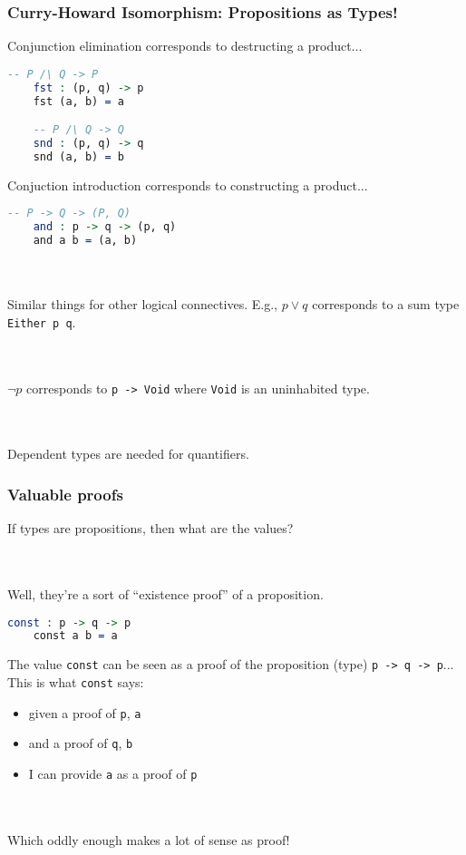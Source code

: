 \documentclass{beamer}
\begin{document}
\begin{frame}[fragile]
  \frametitle{Curry-Howard Isomorphism: Propositions as Types!}

  Conjunction elimination corresponds to destructing a product...
  \begin{lstlisting}[language=Idris]
    -- P /\ Q -> P
    fst : (p, q) -> p
    fst (a, b) = a

    -- P /\ Q -> Q
    snd : (p, q) -> q
    snd (a, b) = b
  \end{lstlisting}

  \pause
  Conjuction introduction corresponds to constructing a product...
  \begin{lstlisting}[language=Idris]
    -- P -> Q -> (P, Q)
    and : p -> q -> (p, q)
    and a b = (a, b)
  \end{lstlisting}

  \pause \\~\\
  Similar things for other logical connectives. E.g., $p \vee q$ corresponds to a sum type \texttt{Either p q}.

  \pause \\~\\
  $\neg p$ corresponds to \texttt{p -> Void} where \texttt{Void} is an uninhabited type.

  \pause \\~\\
  Dependent types are needed for quantifiers.
\end{frame}

\begin{frame}[fragile]
  \frametitle{Valuable proofs}
  If types are propositions, then what are the values?

  \pause \\~\\
  Well, they're a sort of ``existence proof'' of a proposition.

  \pause
  \begin{lstlisting}[language=Idris]
    const : p -> q -> p
    const a b = a
  \end{lstlisting}

  \pause
  The value \texttt{const} can be seen as a proof of the proposition (type) \texttt{p -> q -> p}... This is what \texttt{const} says:

  \begin{itemize}
  \pause
  \item given a proof of \texttt{p}, \texttt{a}
  \pause
  \item and a proof of \texttt{q}, \texttt{b}
  \pause
  \item I can provide \texttt{a} as a proof of \texttt{p}
  \end{itemize}

  \pause \\~\\
  Which oddly enough makes a lot of sense as proof!
\end{frame}
\end{document}
